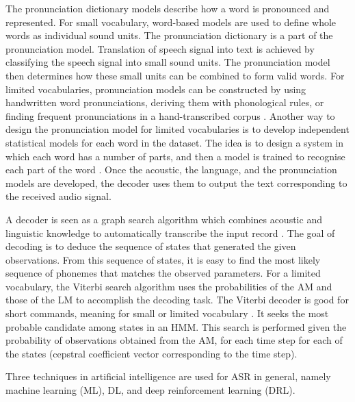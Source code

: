 The pronunciation dictionary models describe how a word is pronounced and represented. For small vocabulary, word-based models are used to define whole words as individual sound units. The pronunciation dictionary is a part of the pronunciation model. Translation of speech signal into text is achieved by classifying the speech signal into small sound units. The pronunciation model then determines how these small units can be combined to form valid words. For limited vocabularies, pronunciation models can be constructed by using handwritten word pronunciations, deriving them with phonological rules, or finding frequent pronunciations in a hand-transcribed corpus . Another way to design the pronunciation model for limited vocabularies is to develop independent statistical models for each word in the dataset. The idea is to design a system in which each word has a number of parts, and then a model is trained to recognise each part of the word .
Once the acoustic, the language, and the pronunciation models are developed, the decoder uses them to output the text corresponding to the received audio signal.

A decoder is seen as a graph search algorithm which combines acoustic and linguistic knowledge to automatically transcribe the input record . The goal of decoding is to deduce the sequence of states that generated the given observations. From this sequence of states, it is easy to find the most likely sequence of phonemes that matches the observed parameters. For a limited vocabulary, the Viterbi search algorithm  uses the probabilities of the AM and those of the LM to accomplish the decoding task. The Viterbi decoder is good for short commands, meaning for small or limited vocabulary . It seeks the most probable candidate among states in an HMM. This search is performed given the probability of observations obtained from the AM, for each time step for each of the states (cepstral coefficient vector corresponding to the time step).

Three techniques in artificial intelligence are used for ASR in general, namely machine learning (ML), DL, and deep reinforcement learning (DRL).

